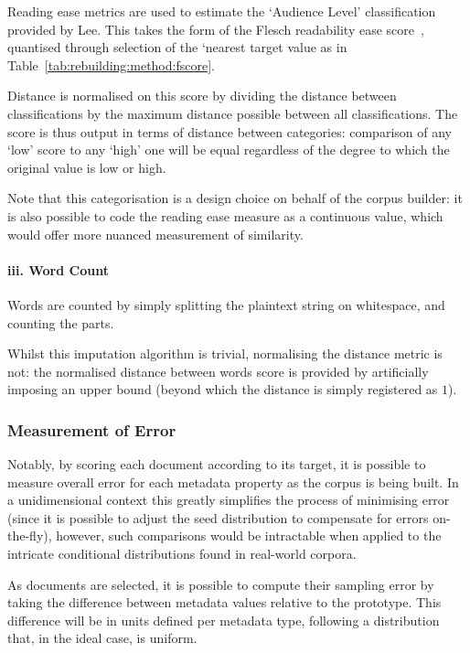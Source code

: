 Reading ease metrics are used to estimate the `Audience Level' classification provided by Lee.  This takes the form of the Flesch readability ease score~\cite{flesch1948new}, quantised through selection of the `nearest target value as in Table~\ref{tab:rebuilding:method:fscore}.

Distance is normalised on this score by dividing the distance between classifications by the maximum distance possible between all classifications.  The score is thus output in terms of distance between categories: comparison of any `low' score to any `high' one will be equal regardless of the degree to which the original value is low or high.

Note that this categorisation is a design choice on behalf of the corpus builder: it is also possible to code the reading ease measure as a continuous value, which would offer more nuanced measurement of similarity.


\paragraph{iii. Word Count}
Words are counted by simply splitting the plaintext string on whitespace, and counting the parts.

Whilst this imputation algorithm is trivial, normalising the distance metric is not: the normalised distance between words score is provided by artificially imposing an upper bound (beyond which the distance is simply registered as $1$).




\subsubsection{Measurement of Error}
\label{sec:rebuilding:method:errormeasure}
Notably, by scoring each document according to its target, it is possible to measure overall error for each metadata property as the corpus is being built.  In a unidimensional context this greatly simplifies the process of minimising error (since it is possible to adjust the seed distribution to compensate for errors on-the-fly), however, such comparisons would be intractable when applied to the intricate conditional distributions found in real-world corpora.



As documents are selected, it is possible to compute their sampling error by taking the difference between metadata values relative to the prototype.  This difference will be in units defined per metadata type, following a distribution that, in the ideal case, is uniform.

